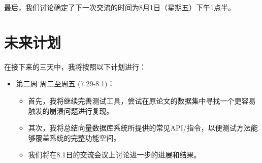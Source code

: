 \documentclass[UTF8]{ctexart}
\begin{document}
最后，我们讨论确定了下一次交流的时间为8月1日（星期五）下午1点半。

\section{未来计划}

在接下来的三天中，我将按照以下计划进行：

\begin{itemize}
    \item 第二周 周二至周五 (7.29-8.1)：
    \begin{itemize}
        \item 首先，我将继续完善测试工具，尝试在原论文的数据集中寻找一个更容易触发的崩溃问题进行复现。
        \item 其次，我将总结向量数据库系统所提供的常见API/指令，以便测试方法能够覆盖系统的完整功能空间。
        \item 我们将在8.1日的交流会议上讨论进一步的进展和结果。
    \end{itemize}
\end{itemize}
\end{document}
